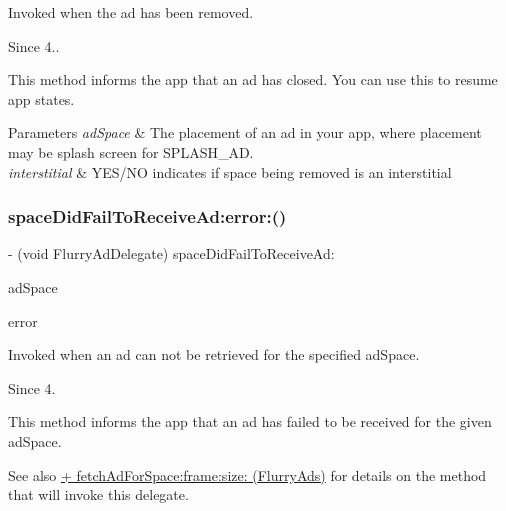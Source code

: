 Invoked when the ad has been removed. 

\begin{DoxySince}{Since}
4..
\end{DoxySince}
This method informs the app that an ad has closed. You can use this to resume app states.


\begin{DoxyParams}{Parameters}
{\em ad\+Space} & The placement of an ad in your app, where placement may be splash screen for S\+P\+L\+A\+S\+H\+\_\+\+AD. \\
\hline
{\em interstitial} & Y\+E\+S/\+NO indicates if space being removed is an interstitial \\
\hline
\end{DoxyParams}
\mbox{\label{protocolFlurryAdDelegate_01-p_af97ae68142b2dde8c4428cffacfa00b4}} 
\subsubsection{\texorpdfstring{space\+Did\+Fail\+To\+Receive\+Ad\+:error\+:()}{spaceDidFailToReceiveAd:error:()}}
{\footnotesize\ttfamily -\/ (void Flurry\+Ad\+Delegate) space\+Did\+Fail\+To\+Receive\+Ad\+: \begin{DoxyParamCaption}\item[{(N\+S\+String $\ast$)}]{ad\+Space }\item[{error:(N\+S\+Error $\ast$)}]{error }\end{DoxyParamCaption}\hspace{0.3cm}{\ttfamily [optional]}}



Invoked when an ad can not be retrieved for the specified {\ttfamily ad\+Space}. 

\begin{DoxySince}{Since}
4.
\end{DoxySince}
This method informs the app that an ad has failed to be received for the given ad\+Space.

\begin{DoxySeeAlso}{See also}
\hyperlink{interfaceFlurryAds_a7eb674e15673f908467be52017169368}{+ fetch\+Ad\+For\+Space\+:frame\+:size\+: (\+Flurry\+Ads)} for details on the method that will invoke this delegate.
\end{DoxySeeAlso}

